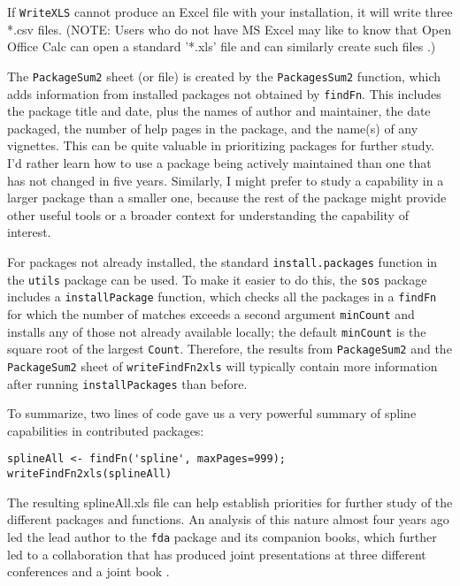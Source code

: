 If {\tt WriteXLS} cannot produce an Excel file with your
installation, it will write three *.csv files.  (NOTE:
Users who do not have MS Excel may like to know that
Open Office Calc can open a standard '*.xls' file and
can similarly create such files \citep{CALC09MAN}.)

The {\tt PackageSum2} sheet (or file) is created by the
{\tt PackagesSum2} function, which adds information from
installed packages not obtained by
{\tt findFn}.  This includes the package title and date, plus 
the names of author and maintainer,
the date packaged, the number of help pages in the package,
and the name(s) of any vignettes.  This can be quite
valuable in prioritizing packages for further study.  I'd 
rather learn how to use a package being actively maintained 
than one that has not changed in five years.  Similarly, 
I might prefer to study a capability in a larger package 
than a smaller one, because the rest of the package might 
provide other useful tools or a broader context for 
understanding the capability of interest.  

For packages not already installed, the standard
{\tt install.packages} function in the {\tt utils} 
package can be used.  To make it easier to do this, 
the {\tt sos} package includes a {\tt installPackage} 
function, which checks all the packages in a 
{\tt findFn} for which
the number of matches exceeds a second argument {\tt minCount}
and installs any of those not already available locally;  the
default {\tt minCount} is the square root of the largest
{\tt Count}.  Therefore, the results from {\tt PackageSum2} and the
{\tt PackageSum2} sheet of {\tt writeFindFn2xls} will typically
contain more information after running {\tt installPackages}
than before.

To summarize, two lines of code gave us a very powerful 
summary of spline capabilities in contributed \R{} 
packages:  

\begin{verbatim}
splineAll <- findFn('spline', maxPages=999);
writeFindFn2xls(splineAll)
\end{verbatim}

The resulting splineAll.xls file can help establish priorities for further study of the
different packages and functions.  An analysis of this nature
almost four years ago led the lead author to the {\tt fda}
package and its companion books, which further led to a
collaboration that has produced joint presentations at three different
conferences and a joint book \citep{RHG09}.


